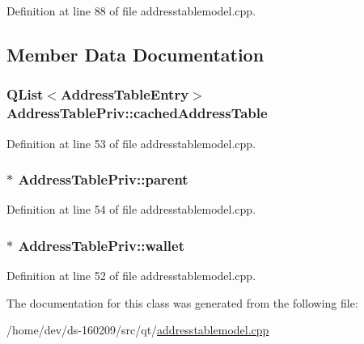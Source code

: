 Definition at line 88 of file addresstablemodel.\+cpp.



\subsection{Member Data Documentation}
\hypertarget{class_address_table_priv_a0ef3118dd421927db0ba41e2a27c40c7}{}
\subsubsection[{cached\+Address\+Table}]{\setlength{\rightskip}{0pt plus 5cm}Q\+List$<${\bf Address\+Table\+Entry}$>$ Address\+Table\+Priv\+::cached\+Address\+Table}\label{class_address_table_priv_a0ef3118dd421927db0ba41e2a27c40c7}


Definition at line 53 of file addresstablemodel.\+cpp.

\hypertarget{class_address_table_priv_ab0b98e86cab673315860630eafbd6561}{}
\subsubsection[{parent}]{$\ast$ Address\+Table\+Priv\+::parent}\label{class_address_table_priv_ab0b98e86cab673315860630eafbd6561}


Definition at line 54 of file addresstablemodel.\+cpp.

\hypertarget{class_address_table_priv_ad3506d642e5546251e76fbf0d75b2aca}{}
\subsubsection[{wallet}]{$\ast$ Address\+Table\+Priv\+::wallet}\label{class_address_table_priv_ad3506d642e5546251e76fbf0d75b2aca}


Definition at line 52 of file addresstablemodel.\+cpp.



The documentation for this class was generated from the following file\+:\begin{DoxyCompactItemize}
\item 
/home/dev/ds-\/160209/src/qt/\hyperlink{addresstablemodel_8cpp}{addresstablemodel.\+cpp}\end{DoxyCompactItemize}
